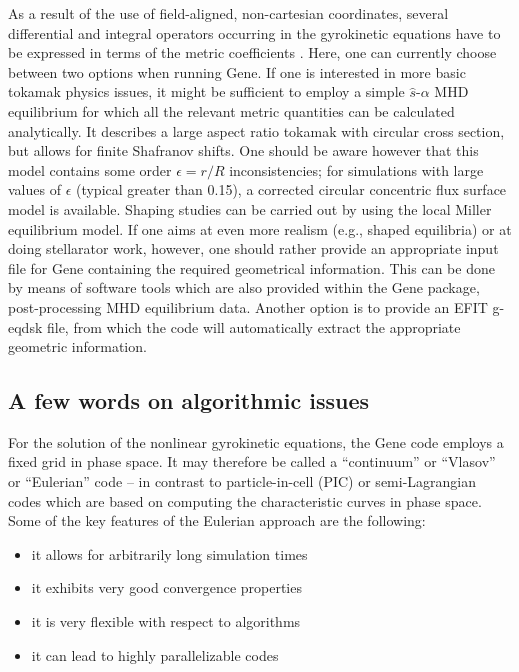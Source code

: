 \documentclass[12pt]{article}
\begin{document}
As a result of the use of field-aligned, non-cartesian
coordinates, several differential and integral operators occurring
in the gyrokinetic equations have to be expressed in terms of the
metric coefficients \cite{tracer}. Here, one can currently choose
between two options when running {\sc Gene}. If one is interested
in more basic tokamak physics issues, it might be sufficient to
employ a simple $\hat s$-$\alpha$ MHD equilibrium for which all
the relevant metric quantities can be calculated analytically. It
describes a large aspect ratio tokamak with circular cross
section, but allows for finite Shafranov shifts. One should be aware however
that this model contains some order $\epsilon=r/R$ inconsistencies; for
simulations with large values of $\epsilon$ (typical greater than 0.15),
a corrected circular concentric flux surface model is available. Shaping
studies can be carried out by using the local Miller equilibrium model. If one
aims at even more realism (e.g., shaped equilibria) or at doing stellarator
work, however, one should rather provide an appropriate input file
for {\sc Gene} containing the required geometrical information.
This can be done by means of software tools which are also
provided within the {\sc Gene} package, post-processing MHD
equilibrium data.
Another option is to provide an EFIT g-eqdsk file, from which the
code will automatically extract the appropriate geometric information.


\subsection{A few words on algorithmic issues}

For the solution of the nonlinear gyrokinetic equations, the {\sc Gene} code employs a fixed grid
in phase space. It may therefore be called a ``continuum'' or ``Vlasov'' or ``Eulerian'' code --
in contrast to particle-in-cell (PIC) or semi-Lagrangian codes which are based on computing the
characteristic curves in phase space. Some of the key features of the Eulerian approach are the
following:
\begin{itemize}
\item it allows for arbitrarily long simulation times
\item it exhibits very good convergence properties
\item it is very flexible with respect to algorithms
\item it can lead to highly parallelizable codes
\end{itemize}
\end{document}
